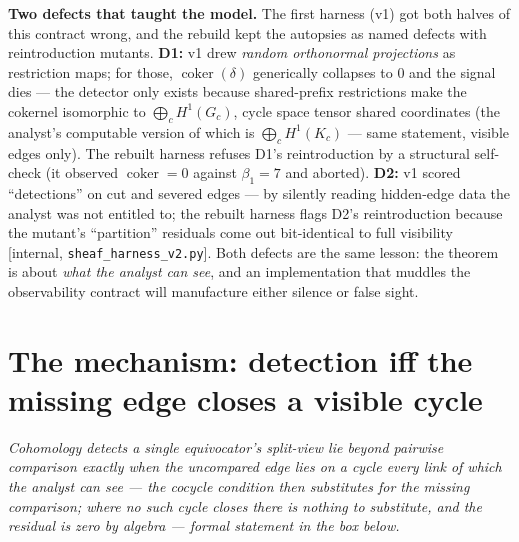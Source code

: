 \documentclass[11pt,a4paper]{article}
\newcommand{\onebreath}[1]{\begin{center}\emph{#1}\end{center}}
\begin{document}


\textbf{Two defects that taught the model.} The first harness (v1) got both halves of this contract wrong, and the rebuild
kept the autopsies as named defects with reintroduction mutants. \textbf{D1:} v1 drew \emph{random orthonormal projections}
as restriction maps; for those, $\operatorname{coker}(\delta)$ generically collapses to $0$ and the signal dies --- the
detector only exists because shared-prefix restrictions make the cokernel isomorphic to
$\bigoplus_c H^1(G_c)$, cycle space tensor shared coordinates (the analyst's computable version of which is
$\bigoplus_c H^1(K_c)$ --- same statement, visible edges only). The rebuilt harness refuses D1's reintroduction by a
structural self-check (it observed $\operatorname{coker}=0$ against $\beta_1=7$ and aborted). \textbf{D2:} v1 scored
``detections'' on cut and severed edges --- by silently reading hidden-edge data the analyst was not entitled to; the rebuilt
harness flags D2's reintroduction because the mutant's ``partition'' residuals come out bit-identical to full visibility
[internal, \texttt{sheaf\_harness\_v2.py}]. Both defects are the same lesson: the theorem is about \emph{what the analyst
can see}, and an implementation that muddles the observability contract will manufacture either silence or false sight.

\section{The mechanism: detection iff the missing edge closes a visible cycle}\label{sec:mechanism}

\onebreath{Cohomology detects a single equivocator's split-view lie beyond pairwise comparison exactly when the uncompared
edge lies on a cycle every link of which the analyst can see --- the cocycle condition then substitutes for the missing
comparison; where no such cycle closes there is nothing to substitute, and the residual is zero by algebra --- formal
statement in the box below.}
\end{document}
